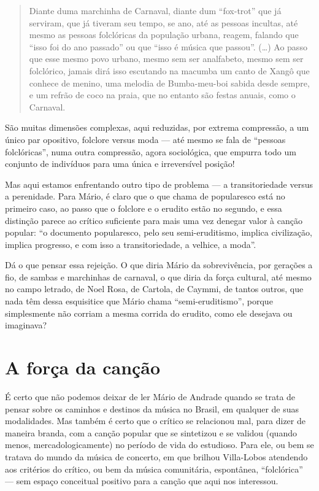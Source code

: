 \begin{quote}
Diante duma marchinha de Carnaval, diante dum ``fox-trot'' que já
serviram, que já tiveram seu tempo, se ano, até as pessoas incultas, até
mesmo as pessoas folclóricas da população urbana, reagem, falando que
``isso foi do ano passado'' ou que ``isso é música que passou''. (\ldots{})
Ao passo que esse mesmo povo urbano, mesmo sem ser analfabeto, mesmo sem
ser folclórico, jamais dirá isso escutando na macumba um canto de Xangô
que conhece de menino, uma melodia de Bumba-meu-boi sabida desde sempre,
e um refrão de coco na praia, que no entanto são festas anuais, como o
Carnaval.
\end{quote}

São muitas dimensões complexas, aqui reduzidas, por extrema compressão,
a um único par opositivo, folclore versus moda --- até mesmo se fala de
``pessoas folclóricas'', numa outra compressão, agora sociológica, que
empurra todo um conjunto de indivíduos para uma única e irreversível
posição!

Mas aqui estamos enfrentando outro tipo de problema --- a transitoriedade
versus a perenidade. Para Mário, é claro que o que chama de popularesco
está no primeiro caso, ao passo que o folclore e o erudito estão no
segundo, e essa distinção parece ao crítico suficiente para mais uma vez
denegar valor à canção popular: ``o documento popularesco, pelo seu
semi-eruditismo, implica civilização, implica progresso, e com isso a
transitoriedade, a velhice, a moda''.

Dá o que pensar essa rejeição. O que diria Mário da sobrevivência, por
gerações a fio, de sambas e marchinhas de carnaval, o que diria da força
cultural, até mesmo no campo letrado, de Noel Rosa, de Cartola, de
Caymmi, de tantos outros, que nada têm dessa esquisitice que Mário chama
``semi-eruditismo'', porque simplesmente não corriam a mesma corrida do
erudito, como ele desejava ou imaginava?

\section{A força da canção}

É certo que não podemos deixar de ler Mário de Andrade quando se trata
de pensar sobre os caminhos e destinos da música no Brasil, em qualquer
de suas modalidades. Mas também é certo que o crítico se relacionou mal,
para dizer de maneira branda, com a canção popular que se sintetizou e
se validou (quando menos, mercadologicamente) no período de vida do
estudioso. Para ele, ou bem se tratava do mundo da música de concerto,
em que brilhou Villa-Lobos atendendo aos critérios do crítico, ou bem da
música comunitária, espontânea, ``folclórica'' --- sem espaço conceitual
positivo para a canção que aqui nos interessou.

